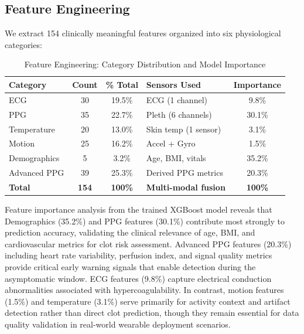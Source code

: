 \documentclass[3p,times,procedia]{elsarticle}
\begin{document}
\subsection{{Feature Engineering}}
\vspace{-2pt}
We extract 154 clinically meaningful features organized into six physiological categories:
\vspace{0.2 cm}
\begin{table}[h]
\centering
\begin{tabular}{|l|c|c|l|c|}
\hline
\rowcolor{gray!20}
\textbf{Category} & \textbf{Count} & \textbf{\% Total} & \textbf{Sensors Used} & \textbf{Importance} \\
\hline
ECG & 30 & 19.5\% & ECG (1 channel) & 9.8\% \\
\rowcolor{gray!10}
PPG & 35 & 22.7\% & Pleth (6 channels) & 30.1\% \\
Temperature & 20 & 13.0\% & Skin temp (1 sensor) & 3.1\% \\
\rowcolor{gray!10}
Motion & 25 & 16.2\% & Accel + Gyro & 1.5\% \\
Demographics & 5 & 3.2\% & Age, BMI, vitals & 35.2\% \\
\rowcolor{gray!10}
Advanced PPG & 39 & 25.3\% & Derived PPG metrics & 20.3\% \\
\hline
\rowcolor{gray!20}
\textbf{Total} & \textbf{154} & \textbf{100\%} & \textbf{Multi-modal fusion} & \textbf{100\%} \\
\hline
\end{tabular}

\caption{Feature Engineering: Category Distribution and Model Importance}
\end{table}

Feature importance analysis from the trained XGBoost model reveals that Demographics (35.2\%) and PPG features (30.1\%) contribute most strongly to prediction accuracy, validating the clinical relevance of age, BMI, and cardiovascular metrics for clot risk assessment. Advanced PPG features (20.3\%) including heart rate variability, perfusion index, and signal quality metrics provide critical early warning signals that enable detection during the asymptomatic window. ECG features (9.8\%) capture electrical conduction abnormalities associated with hypercoagulability. In contrast, motion features (1.5\%) and temperature (3.1\%) serve primarily for activity context and artifact detection rather than direct clot prediction, though they remain essential for data quality validation in real-world wearable deployment scenarios.
\end{document}
